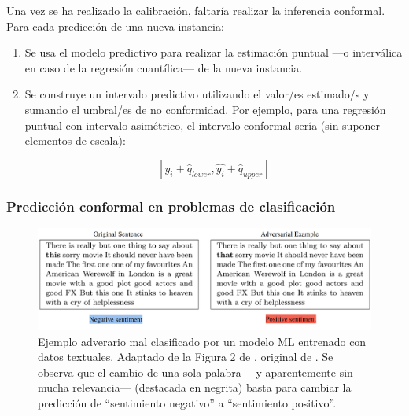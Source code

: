 Una vez se ha realizado la calibración, faltaría realizar la inferencia conformal. Para cada predicción de una
nueva instancia:

\begin{enumerate}

    \item Se usa el modelo predictivo para realizar la estimación puntual ---o interválica en caso de la 
    regresión cuantílica--- de la nueva instancia. 
    
    \item Se construye un intervalo predictivo utilizando el valor/es estimado/s y sumando el umbral/es de no
    conformidad. Por ejemplo, para una regresión puntual con intervalo asimétrico, el intervalo conformal 
    sería (sin suponer elementos de escala):

    $$
    \left[ \hat{y_i} + \hat{q}_{lower}, \hat{y_i} + \hat{q}_{upper} \right]
    $$

\end{enumerate}




\subsubsection{Predicción conformal en problemas de clasificación}





\begin{figure}[h]
    \centering
    \includegraphics[width=\textwidth]{capitulos/cap_02/imagenes/adversarial_example.png}
    \caption[
        Ejemplo adverario mal clasificado por un modelo ML entrenado con datos textuales.
        Adaptado de la Figura 2 de \cite{hullermeier2021}, original de \cite{sato2018}.
    ]{
        Ejemplo adverario mal clasificado por un modelo ML entrenado con datos textuales.
        Adaptado de la Figura 2 de \cite{hullermeier2021}, original de \cite{sato2018}.
        Se observa que el cambio de una sola palabra ---y aparentemente sin mucha relevancia--- (destacada en 
        negrita) basta para cambiar la predicción de ``sentimiento negativo'' a ``sentimiento positivo''.
    } 
    \label{fig:adversarial_example}
\end{figure}





